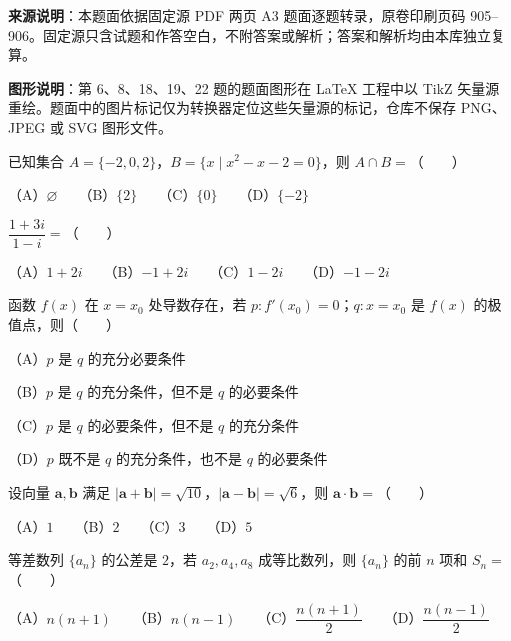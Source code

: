 


\begin{gktip}
\textbf{来源说明}：本题面依据固定源 PDF 两页 A3 题面逐题转录，原卷印刷页码 905–906。固定源只含试题和作答空白，不附答案或解析；答案和解析均由本库独立复算。

\textbf{图形说明}：第 6、8、18、19、22 题的题面图形在 LaTeX 工程中以 TikZ 矢量源重绘。题面中的图片标记仅为转换器定位这些矢量源的标记，仓库不保存 PNG、JPEG 或 SVG 图形文件。
\end{gktip}


\begin{question}
已知集合 $A=\{-2,0,2\}$，$B=\{x\mid x^2-x-2=0\}$，则 $A\cap B=$\mbox{（　　）}

（A）$\varnothing$　　（B）$\{2\}$　　（C）$\{0\}$　　（D）$\{-2\}$

\end{question}
\begin{question}
$\dfrac{1+3i}{1-i}=$\mbox{（　　）}

（A）$1+2i$　　（B）$-1+2i$　　（C）$1-2i$　　（D）$-1-2i$

\end{question}
\begin{question}
函数 $f(x)$ 在 $x=x_0$ 处导数存在，若 $p:f'(x_0)=0$；$q:x=x_0$ 是 $f(x)$ 的极值点，则\mbox{（　　）}

（A）$p$ 是 $q$ 的充分必要条件

（B）$p$ 是 $q$ 的充分条件，但不是 $q$ 的必要条件

（C）$p$ 是 $q$ 的必要条件，但不是 $q$ 的充分条件

（D）$p$ 既不是 $q$ 的充分条件，也不是 $q$ 的必要条件

\end{question}
\begin{question}
设向量 $\boldsymbol a,\boldsymbol b$ 满足 $|\boldsymbol a+\boldsymbol b|=\sqrt{10}$，$|\boldsymbol a-\boldsymbol b|=\sqrt6$，则 $\boldsymbol a\cdot\boldsymbol b=$\mbox{（　　）}

（A）$1$　　（B）$2$　　（C）$3$　　（D）$5$

\end{question}
\begin{question}
等差数列 $\{a_n\}$ 的公差是 $2$，若 $a_2,a_4,a_8$ 成等比数列，则 $\{a_n\}$ 的前 $n$ 项和 $S_n=$\mbox{（　　）}

（A）$n(n+1)$　　（B）$n(n-1)$　　（C）$\dfrac{n(n+1)}2$　　（D）$\dfrac{n(n-1)}2$

\Needspace{0.4\textheight}
\end{question}

